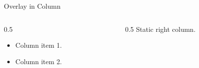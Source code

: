 \documentclass[14pt,t]{beamer}
\begin{document}
\begin{frame}{Overlay in Column}
\begin{columns}[T]
\begin{column}{0.5\textwidth}
\begin{itemize}
\item<1-> Column item 1.
\item<2-> Column item 2.
\end{itemize}
\end{column}
\begin{column}{0.5\textwidth}
Static right column.
\end{column}
\end{columns}
\end{frame}
\end{document}
